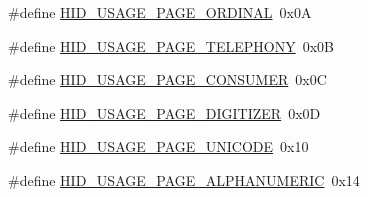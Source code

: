 \begin{DoxyCompactItemize}
\item 
\#define \hyperlink{group__USBD__HID_ga3a95742428e1df3ffb0e6ce94d4b5f70}{H\-I\-D\-\_\-\-U\-S\-A\-G\-E\-\_\-\-P\-A\-G\-E\-\_\-\-O\-R\-D\-I\-N\-A\-L}~0x0\-A
\item 
\#define \hyperlink{group__USBD__HID_ga1e9dbe0dd0699f313276f9f0d6a82bbb}{H\-I\-D\-\_\-\-U\-S\-A\-G\-E\-\_\-\-P\-A\-G\-E\-\_\-\-T\-E\-L\-E\-P\-H\-O\-N\-Y}~0x0\-B
\item 
\#define \hyperlink{group__USBD__HID_gab0073496a706dcf681841328f14e53c3}{H\-I\-D\-\_\-\-U\-S\-A\-G\-E\-\_\-\-P\-A\-G\-E\-\_\-\-C\-O\-N\-S\-U\-M\-E\-R}~0x0\-C
\item 
\#define \hyperlink{group__USBD__HID_gaf5dd509fe6bf4e8f400720e46cc93639}{H\-I\-D\-\_\-\-U\-S\-A\-G\-E\-\_\-\-P\-A\-G\-E\-\_\-\-D\-I\-G\-I\-T\-I\-Z\-E\-R}~0x0\-D
\item 
\#define \hyperlink{group__USBD__HID_gac7b3e712eaff97931f7d5fc36468ec0d}{H\-I\-D\-\_\-\-U\-S\-A\-G\-E\-\_\-\-P\-A\-G\-E\-\_\-\-U\-N\-I\-C\-O\-D\-E}~0x10
\item 
\#define \hyperlink{group__USBD__HID_gabbec7fd25201bab7caa5abaed67f9152}{H\-I\-D\-\_\-\-U\-S\-A\-G\-E\-\_\-\-P\-A\-G\-E\-\_\-\-A\-L\-P\-H\-A\-N\-U\-M\-E\-R\-I\-C}~0x14
\end{DoxyCompactItemize}
